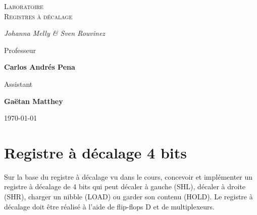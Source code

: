 \documentclass[a4paper]{article} %
\begin{document}
\begin{titlepage}
	\centering
	
	{\scshape\LARGE \color{Monokaimagenta} Laboratoire \\ Registres à décalage \par}
	
	\vspace{1cm}
	
	{\Large\itshape Johanna Melly \& Sven Rouvinez\par}
	
	\vfill
	Professeur\par
	\textbf{Carlos Andrés Pena} \par%
	\vspace{1cm}
	Assistant\par
	\textbf{Gaëtan Matthey}
	
	\vfill

	{\large \today\par}
	
\end{titlepage}

\section{Registre à décalage 4 bits}
Sur la base du registre à décalage vu dans le cours, concevoir et implémenter un registre à décalage de 4 bits qui peut décaler à gauche (SHL), décaler à droite (SHR), charger un nibble (LOAD) ou garder son contenu (HOLD). Le registre à décalage doit être réalisé à l’aide de flip-flops D et de multiplexeurs.\\%
\end{document}
